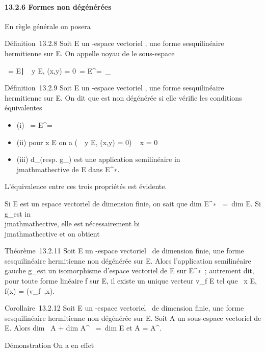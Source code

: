 \documentclass[]{article}
\begin{document}
\paragraph{13.2.6 Formes non dégénérées}

En règle générale on posera

Définition~13.2.8 Soit E un -espace vectoriel , \phi une forme
sesquilinéaire hermitienne sur E. On appelle noyau de \phi le sous-espace

\mathrmKer~\phi =
\x \in
E∣\forall~~y \in E, \phi(x,y) =
0\ = E^\bot =\
\mathrmKerd_ \phi

Définition~13.2.9 Soit E un -espace vectoriel , \phi une forme
sesquilinéaire hermitienne sur E. On dit que \phi est non dégénérée si elle
vérifie les conditions équivalentes

\begin{itemize}
\itemsep1pt\parskip0pt
\item
  (i) \mathrmKer~\phi =
  E^\bot = \0\
\item
  (ii) pour x \in E on a \left
  (\forall~~y \in E, \phi(x,y) = 0\right ) \rigtharrow~
  x = 0
\item
  (iii) d_\phi (resp. g_\phi) est une application
  semilinéaire in\\jmathmathective de E dans E^∗.
\end{itemize}

L'équivalence entre ces trois propriétés est évidente.

Si E est un espace vectoriel de dimension finie, on sait que
dim E^∗~ =\
dim E. Si g_\phi est in\\jmathmathective, elle est nécessairement
bi\\jmathmathective et on obtient

Théorème~13.2.11 Soit E un \mathbb{C}-espace vectoriel ~de dimension finie, \phi une
forme sesquilinéaire hermitienne non dégénérée sur E. Alors
l'application semilinéaire gauche g_\phi est un isomorphisme
d'espace vectoriel de E sur E^∗~; autrement dit, pour toute
forme linéaire f sur E, il existe un unique vecteur v_f \in E tel
que \forall~x \in E, f(x) = \phi(v_f~,x).

Corollaire~13.2.12 Soit E un \mathbb{C}-espace vectoriel ~de dimension finie, \phi
une forme sesquilinéaire hermitienne non dégénérée sur E. Soit A un
sous-espace vectoriel de E. Alors dim~ A
+ dim A^\bot~ =\
dim E et A = A^\bot\bot.

Démonstration On a en effet
\end{document}
